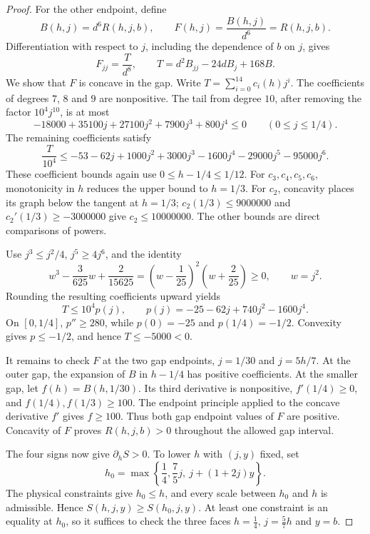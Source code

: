 \begin{proof}
For the other endpoint, define
\[
 B(h,j)=d^6R(h,j,b),\qquad F(h,j)=\frac{B(h,j)}{d^6}=R(h,j,b).
\]
Differentiation with respect to $j$, including the dependence of $b$ on $j$,
gives
\[
 F_{jj}=\frac{T}{d^8},\qquad
 T=d^2B_{jj}-24dB_j+168B.
\]
We show that $F$ is concave in the gap. Write $T=\sum_{i=0}^{14}c_i(h)j^i$.
The coefficients of degrees $7$, $8$ and $9$ are nonpositive. The tail from
degree $10$, after removing the factor $10^4j^{10}$, is at most
\[
 -18000+35100j+27100j^2+7900j^3+800j^4\le0
 \qquad(0\le j\le1/4).
\]
The remaining coefficients satisfy
\[
 \frac{T}{10^4}\le-53-62j+1000j^2+3000j^3
                 -1600j^4-29000j^5-95000j^6.
\]
These coefficient bounds again use $0\le h-1/4\le1/12$.
For $c_3,c_4,c_5,c_6$, monotonicity in $h$ reduces the upper bound to $h=1/3$.
For $c_2$, concavity places its graph below the tangent at $h=1/3$;
$c_2(1/3)\le9000000$ and $c_2'(1/3)\ge-3000000$ give $c_2\le10000000$.
The other bounds are direct comparisons of powers.

Use $j^3\le j^2/4$, $j^5\ge4j^6$, and the identity
\[
 w^3-\frac{3}{625}w+\frac{2}{15625}
       =\left(w-\frac1{25}\right)^2\left(w+\frac2{25}\right)\ge0,
 \qquad w=j^2.
\]
Rounding the resulting coefficients upward yields
\[
 T\le10^4p(j),\qquad p(j)=-25-62j+740j^2-1600j^4.
\]
On $[0,1/4]$, $p''\ge280$, while $p(0)=-25$ and $p(1/4)=-1/2$.
Convexity gives $p\le-1/2$, and hence $T\le-5000<0$.

It remains to check $F$ at the two gap endpoints, $j=1/30$ and $j=5h/7$.
At the outer gap, the expansion of $B$ in $h-1/4$ has positive coefficients.
At the smaller gap, let $f(h)=B(h,1/30)$. Its third derivative is nonpositive,
$f'(1/4)\ge0$, and $f(1/4),f(1/3)\ge100$. The endpoint principle applied to
the concave derivative $f'$ gives $f\ge100$. Thus both gap endpoint values
of $F$ are positive. Concavity of $F$ proves $R(h,j,b)>0$ throughout the
allowed gap interval.

The four signs now give $\partial_hS>0$. To lower $h$ with $(j,y)$ fixed, set
\[
 h_0=\max\left\{\frac14,\frac75j,\ j+(1+2j)y\right\}.
\]
The physical constraints give $h_0\le h$, and every scale between $h_0$ and $h$
is admissible. Hence $S(h,j,y)\ge S(h_0,j,y)$. At least one constraint is an
equality at $h_0$, so it suffices to check the three faces $h=\frac14$,
$j=\frac57h$ and $y=b$.


\end{proof}
